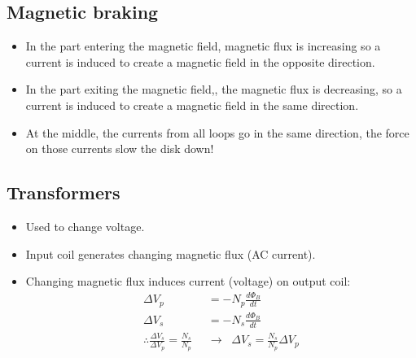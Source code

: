 \documentclass[aspectratio=169,
hyperref={colorlinks,urlcolor=blue}
]{beamer}
\begin{document}
\subsection{Magnetic braking}
{
\begin{itemize}
\item In the part entering the magnetic field, magnetic flux is increasing so a current is induced to create a magnetic field in the opposite direction.
\item In the part exiting the magnetic field,, the magnetic flux is decreasing, so a current is induced to create a magnetic field in the same direction.
\item At the middle, the currents from all loops go in the same direction, the force on those currents slow the disk down!
\end{itemize}
}
{
\vspace{-1cm}
\vspace{-1cm}
}





\subsection{Transformers}
\label{subsec:transformers}
{
\begin{itemize}
\item Used to change voltage.
\item Input coil generates changing magnetic flux (AC current).
\item Changing magnetic flux induces current (voltage) on output coil:
\begin{align*}
\Delta V_p &= -N_p\frac{d\Phi_B}{dt}\\
\Delta V_s &= -N_s\frac{d\Phi_B}{dt}\\
\therefore \frac{\Delta V_s}{\Delta V_p}=\frac{N_s}{N_p} \;\;&\rightarrow\;\; \Delta V_s=\frac{N_s}{N_p}\Delta V_p
\end{align*}
\end{itemize}
}
{
\vspace{-1cm}
\vspace{-1cm}
}
\end{document}
